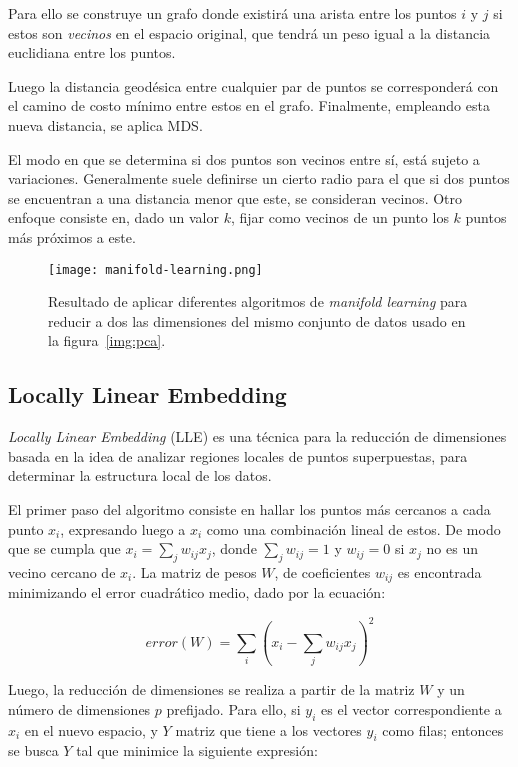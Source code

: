 Para ello se construye un grafo donde existirá una arista entre los puntos $i$ y $j$ si estos son \textit{vecinos} en el espacio original, que tendrá un peso igual a la distancia euclidiana entre los puntos.

Luego la distancia geodésica entre cualquier par de puntos se corresponderá con el camino de costo mínimo entre estos en el grafo.
Finalmente, empleando esta nueva distancia, se aplica MDS\@.

El modo en que se determina si dos puntos son vecinos entre sí, está sujeto a variaciones.
Generalmente suele definirse un cierto radio para el que si dos puntos se encuentran a una distancia menor que este, se consideran vecinos.
Otro enfoque consiste en, dado un valor $k$, fijar como vecinos de un punto los $k$ puntos más próximos a este.

\begin{figure}[!h]
    \centering
    \texttt{[image: manifold-learning.png]}
    \caption{Resultado de aplicar diferentes algoritmos de \textit{manifold learning} para reducir a dos las dimensiones del mismo conjunto de datos usado en la figura~\ref{img:pca}.}
    \label{img:manifold-learning}
\end{figure}

\subsection{Locally Linear Embedding}\label{subsec:LLE}

\textit{Locally Linear Embedding} (LLE) es una técnica para la reducción de dimensiones basada en la idea de analizar regiones locales de puntos superpuestas, para determinar la estructura local de los datos.

El primer paso del algoritmo consiste en hallar los puntos más cercanos a cada punto $x_i$, expresando luego a $x_i$ como una combinación lineal de estos.
De modo que se cumpla que $x_i =\sum_j {w_{ij}x_j}$, donde $\sum_j w_{ij}=1$ y $w_{ij} = 0$ si $x_j$ no es un vecino cercano de $x_i$.
La matriz de pesos $W$, de coeficientes $w_{ij}$ es encontrada minimizando el error cuadrático medio, dado por la ecuación:

\begin{equation}
    error(W) = \sum_i \left( x_i - \sum_j {w_{ij}x_j} \right)^2
\end{equation}

Luego, la reducción de dimensiones se realiza a partir de la matriz $W$ y un número de dimensiones $p$ prefijado.
Para ello, si $y_i$ es el vector correspondiente a $x_i$ en el nuevo espacio, y $Y$ matriz que tiene a los vectores $y_i$ como filas;
entonces se busca $Y$ tal que minimice la siguiente expresión:


